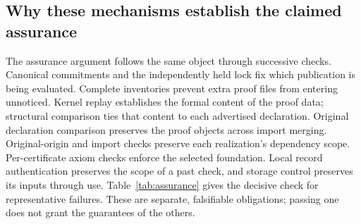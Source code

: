 \documentclass[11pt]{article}
\begin{document}
\subsection{Why these mechanisms establish the claimed assurance}

The assurance argument follows the same object through successive checks.
Canonical commitments and the independently held lock fix which publication
is being evaluated. Complete inventories prevent extra proof files from
entering unnoticed. Kernel replay establishes the formal content of the proof
data; structural comparison ties that content to each advertised declaration.
Original declaration comparison preserves the proof objects across import merging.
Original-origin and import checks preserve each realization's dependency scope.
Per-certificate axiom checks enforce the selected foundation. Local record
authentication preserves the scope of a past check, and storage control
preserves its inputs through use. Table~\ref{tab:assurance} gives the decisive
check for representative failures. These are separate, falsifiable obligations;
passing one does not grant the guarantees of the others.
\end{document}
